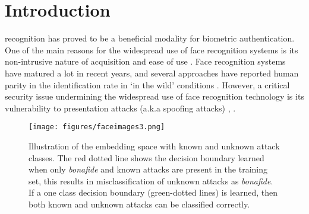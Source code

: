\documentclass[journal]{IEEEtran}
\begin{document}
\IEEEpeerreviewmaketitle



\section{Introduction}


 recognition has proved to be a beneficial modality for biometric authentication. One of the main reasons for the widespread use of face recognition systems is its non-intrusive nature of acquisition and ease of use \cite{jain2011handbook}. Face recognition systems have matured a lot in recent years, and several approaches have reported human parity in the identification rate in `in the wild' conditions \cite{learned2016labeled}. However, a critical security issue undermining the widespread use of face recognition technology is its vulnerability to presentation attacks (a.k.a spoofing attacks) \cite{handbook2}, \cite{ISO}.

\begin{figure}[t!]
\centering
\texttt{[image: figures/faceimages3.png]}
\caption{Illustration of the embedding space with known and unknown attack classes. The red dotted line shows the decision boundary learned when only \textit{bonafide} and known attacks are present in the training set, this results in misclassification of unknown attacks as \textit{bonafide}. If a one class decision boundary (green-dotted lines) is learned, then both known and unknown attacks can be classified correctly. }
\label{fig:embedding_space}
\end{figure}
\end{document}
